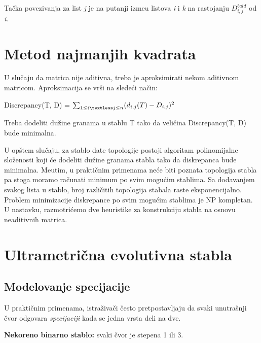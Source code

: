 Ta\v{c}ka povezivanja za list \textit{j} je na putanji izme\dj u listova \textit{i} i \textit{k} na rastojanju $D^{bald}_{i, j}$ od \textit{i}.

\section{Metod najmanjih kvadrata}
\label{sec:metodnajmanjihkvadrata}

U slu\v{c}aju da matrica nije aditivna, treba je aproksimirati nekom aditivnom matricom. Aproksimacija se vr\v{s}i na slede\'ci na\v{c}in:

\begin{tcolorbox}
\begin{center}
Discrepancy(T, D) = $\sum_{1 \leq i \textless j \leq n} (d_{i, j}(T) - D_{i, j})^{2}$
\end{center}
\end{tcolorbox}

Treba dodeliti du\v{z}ine granama u stablu T tako da veli\v{c}ina Discrepancy(T, D) bude minimalna.

U op\v{s}tem slu\v{c}aju, za stablo date topologije postoji algoritam polinomijalne slo\v{z}enosti koji \'ce dodeliti du\v{z}ine granama stabla tako da diskrepanca bude minimalna. Me\dj utim, u prakti\v{c}nim primenama ne\'ce biti poznata topologija stabla pa stoga moramo ra\v{c}unati minimum po svim mogu\'cim stablima. Sa dodavanjem svakog lista u stablo, broj razli\v{c}itih topologija stabala raste eksponencijalno. Problem minimizacije diskrepance po svim mogu\'cim stablima je NP kompletan. U nastavku, razmotri\'cemo dve heuristike za konstrukciju stabla na osnovu neaditivnih matrica.

\section{Ultrametri\v{c}na evolutivna stabla}
\label{sec:ues}

\subsection{Modelovanje specijacije}
\label{subsec:ms}

U prakti\v{c}nim primenama, istra\v{z}iva\v{c}i \v{c}esto pretpostavljaju da svaki unutra\v{s}nji \v{c}vor odgovara \textit{specijaciji} kada se jedna vrsta deli na dve.

\begin{definicija}
\textbf{Nekoreno binarno stablo:} svaki \v{c}vor je stepena 1 ili 3.
\end{definicija}

